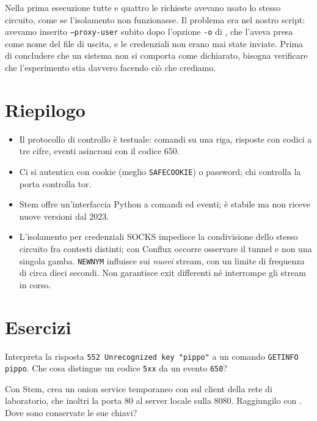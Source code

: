 \begin{attenzione}
Nella prima esecuzione tutte e quattro le richieste avevano usato lo stesso circuito, come se l'isolamento non funzionasse. Il problema era nel nostro script: avevamo inserito \texttt{--proxy-user} subito dopo l'opzione \texttt{-o} di , che l'aveva presa come nome del file di uscita, e le credenziali non erano mai state inviate. Prima di concludere che un sistema non si comporta come dichiarato, bisogna verificare che l'esperimento stia davvero facendo ciò che crediamo.
\end{attenzione}

\section*{Riepilogo}
\begin{itemize}
  \item Il protocollo di controllo è testuale: comandi su una riga, risposte con codici a tre cifre, eventi asincroni con il codice 650.
  \item Ci si autentica con cookie (meglio \texttt{SAFECOOKIE}) o password; chi controlla la porta controlla tor.
  \item Stem offre un'interfaccia Python a comandi ed eventi; è stabile ma non riceve nuove versioni dal 2023.
  \item L'isolamento per credenziali SOCKS impedisce la condivisione dello stesso circuito fra contesti distinti; con Conflux occorre osservare il tunnel e non una singola gamba. \texttt{NEWNYM} influisce sui \emph{nuovi} stream, con un limite di frequenza di circa dieci secondi. Non garantisce exit differenti né interrompe gli stream in corso.
\end{itemize}

\section*{Esercizi}

\begin{esercizio}[1]\label{es:18-codici}
Interpreta la risposta \texttt{552 Unrecognized key "pippo"} a un comando \texttt{GETINFO pippo}. Che cosa distingue un codice \texttt{5xx} da un evento \texttt{650}?
\end{esercizio}

\begin{esercizio}[2]\label{es:18-onion}
Con Stem, crea un onion service temporaneo con  sul client della rete di laboratorio, che inoltri la porta 80 al server locale sulla 8080. Raggiungilo con . Dove sono conservate le sue chiavi?
\end{esercizio}

